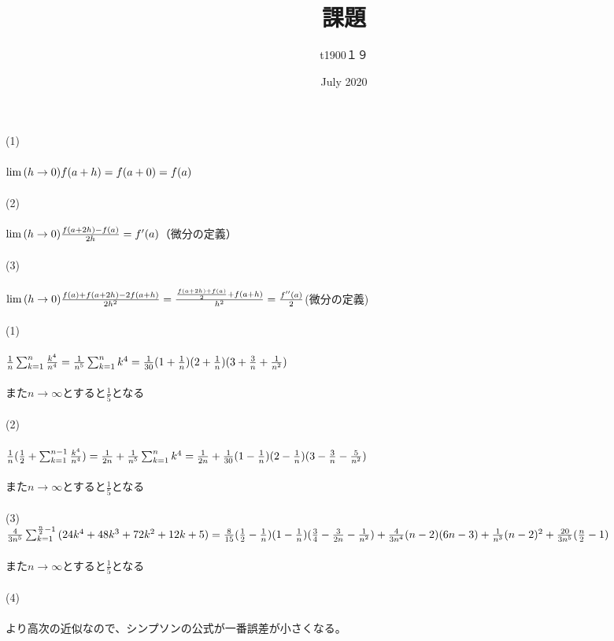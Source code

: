 \documentclass{article}
\title{課題}
\author{t1900１９ }
\date{July 2020}
\begin{document}
\maketitle{}
(1)\\\\
$\lim{(h\to0)}f(a+h)\\\\
=f(a+0)=f(a)$\\\\
(2)\\\\
$\lim{(h\to0)}\frac{f(a+2h)-f(a)}{2h}\\\\
=f'(a)$（微分の定義）\\\\
(3)\\\\
$\lim{(h\to0)}\frac{f(a)+f(a+2h)-2f(a+h)}{2h^{2}}\\\\
=\frac{\frac{f(a+2h)+f(a)}{2}+f(a+h)}{h^{2}}\\\\
=\frac{f''(a)}{2}$(微分の定義)\\\\
(1)\\\\
$\frac{1}{n}\sum_{k=1}^{n}{\frac{k^{4}}{n^{4}}}\\\\
=\frac{1}{n^{5}}\sum_{k=1}^{n}{k^{4}\\\\
=\frac{1}{30}(1+\frac{1}{n})(2+\frac{1}{n})(3+\frac{3}{n}+\frac{1}{n^{2}})}$\\\\
また$n\to \infty$とすると$\frac{1}{5}$となる\\\\
(2)\\\\
$\frac{1}{n}(\frac{1}{2}+\sum_{k=1}^{n-1}{\frac{k^{4}}{n^{4}}})\\\\
=\frac{1}{2n}+\frac{1}{n^{5}}\sum_{k=1}^{n}{k^{4}\\\\
=\frac{1}{2n}+\frac{1}{30}(1-\frac{1}{n})(2-\frac{1}{n})(3-\frac{3}{n}-\frac{5}{n^{2}})}$\\\\
また$n\to \infty$とすると$\frac{1}{5}$となる\\\\
(3)\\$\frac{4}{3n^{5}}\sum_{k=1}^{\frac{n}{2}-1}{(24k^{4}+48k^{3}+72k^{2}+12k+5)}\\\\
=\frac{8}{15}(\frac{1}{2}-\frac{1}{n})(1-\frac{1}{n})(\frac{3}{4}-\frac{3}{2n}-\frac{1}{n^{2}})+\frac{4}{3n^{4}}(n-2)(6n-3)+\frac{1}{n^{3}}(n-2)^{2}+\frac{20}{3n^{5}}(\frac{n}{2}-1)$\\\\
また$n\to \infty$とすると$\frac{1}{5}$となる\\\\
(4)\\\\
より高次の近似なので、シンプソンの公式が一番誤差が小さくなる。
\end{document}
